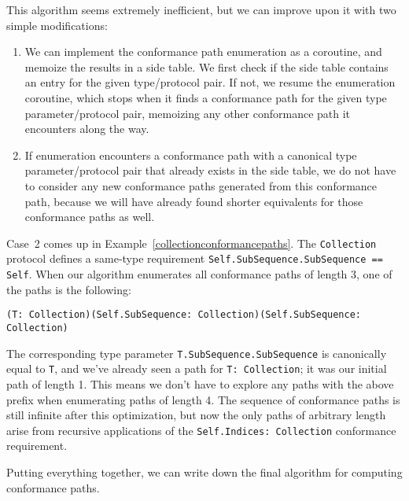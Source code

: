 \documentclass[a4paper,headsepline,bibliography=totoc,toc=flat,fleqn,twoside=semi]{scrbook}
\theoremstyle{definition}
\theoremstyle{definition}
\theoremstyle{definition}
\begin{document}
This algorithm seems extremely inefficient, but we can improve upon it with two simple modifications:
\begin{enumerate}
\item We can implement the conformance path enumeration as a coroutine, and memoize the results in a side table. We first check if the side table contains an entry for the given type/protocol pair. If not, we resume the enumeration coroutine, which stops when it finds a conformance path for the given type parameter/protocol pair, memoizing any other conformance path it encounters along the way.

\item If enumeration encounters a conformance path with a canonical type parameter/protocol pair that already exists in the side table, we do not have to consider any new conformance paths generated from this conformance path, because we will have already found shorter equivalents for those conformance paths as well.
\end{enumerate}

Case~2 comes up in Example~\ref{collectionconformancepaths}. The \texttt{Collection} protocol defines a same-type requirement \texttt{Self.SubSequence.SubSequence == Self}. When our algorithm enumerates all conformance paths of length 3, one of the paths is the following:
\begin{Verbatim}
(T: Collection)(Self.SubSequence: Collection)(Self.SubSequence: Collection)
\end{Verbatim}
The corresponding type parameter \texttt{T.SubSequence.SubSequence} is canonically equal to \texttt{T}, and we've already seen a path for \texttt{T:\ Collection}; it was our initial path of length 1. This means we don't have to explore any paths with the above prefix when enumerating paths of length 4. The sequence of conformance paths is still infinite after this optimization, but now the only paths of arbitrary length arise from recursive applications of the \texttt{Self.Indices:\ Collection} conformance requirement.

Putting everything together, we can write down the final algorithm for computing conformance paths.
\end{document}
